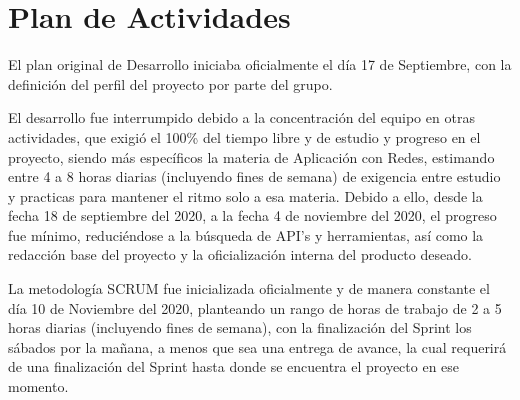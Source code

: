 \chapter{Plan de Actividades}

El plan original de Desarrollo iniciaba oficialmente el día 17 de Septiembre, con la definición del perfil del proyecto por parte del grupo.

El desarrollo fue interrumpido debido a la concentración del equipo en otras actividades, que exigió el 100\% del tiempo libre y de estudio y progreso en el proyecto, siendo más específicos la materia de Aplicación con Redes, estimando entre 4 a 8 horas diarias (incluyendo fines de semana) de exigencia entre estudio y practicas para mantener el ritmo solo a esa materia. Debido a ello, desde la fecha 18 de septiembre del 2020, a la fecha 4 de noviembre del 2020, el progreso fue mínimo, reduciéndose a la búsqueda de API's y herramientas, así como la redacción base del proyecto y la oficialización interna del producto deseado.

La metodología SCRUM fue inicializada oficialmente y de manera constante el día 10 de Noviembre del 2020, planteando un rango de horas de trabajo de 2 a 5 horas diarias (incluyendo fines de semana), con la finalización del Sprint los sábados por la mañana, a menos que sea una entrega de avance, la cual requerirá de una finalización del Sprint hasta donde se encuentra el proyecto en ese momento.


